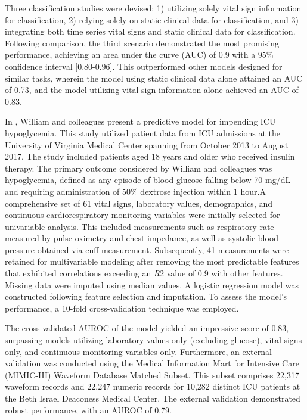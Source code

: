 \documentclass[12pt,a4paper,english
]{tunithesis}
\begin{document}
Three classification studies were devised: 1) utilizing solely vital sign information for classification, 2) relying solely on static clinical data for classification, and 3) integrating both time series vital signs and static clinical data for classification. Following comparison, the third scenario demonstrated the most promising performance, achieving an area under the curve (AUC) of 0.9 with a 95\% confidence interval [0.80-0.96]. This outperformed other models designed for similar tasks, wherein the model using static clinical data alone attained an AUC of 0.73, and the model utilizing vital sign information alone achieved an AUC of 0.83. 

In \textcite{horton2022}, William and colleagues present a predictive model for impending ICU hypoglycemia. This study utilized patient data from ICU admissions at the University of Virginia Medical Center spanning from October 2013 to August 2017. The study included patients aged 18 years and older who received insulin therapy. The primary outcome considered by William and colleagues was hypoglycemia, defined as any episode of blood glucose falling below 70 mg/dL and requiring administration of 50\% dextrose injection within 1 hour.A comprehensive set of 61 vital signs, laboratory values, demographics, and continuous cardiorespiratory monitoring variables were initially selected for univariable analysis. This included measurements such as respiratory rate measured by pulse oximetry and chest impedance, as well as systolic blood pressure obtained via cuff measurement. Subsequently, 41 measurements were retained for multivariable modeling after removing the most predictable features that exhibited correlations exceeding an \textit{R}2  value of 0.9 with other features. Missing data were imputed using median values. A logistic regression model was constructed following feature selection and imputation. To assess the model's performance, a 10-fold cross-validation technique was employed.

The cross-validated AUROC of the model yielded an impressive score of 0.83, surpassing models utilizing laboratory values only (excluding glucose), vital signs only, and continuous monitoring variables only. Furthermore, an external validation was conducted using the Medical Information Mart for Intensive Care (MIMIC-III) Waveform Database Matched Subset. This subset comprises 22,317 waveform records and 22,247 numeric records for 10,282 distinct ICU patients at the Beth Israel Deaconess Medical Center. The external validation demonstrated robust performance, with an AUROC of 0.79. 
\end{document}
